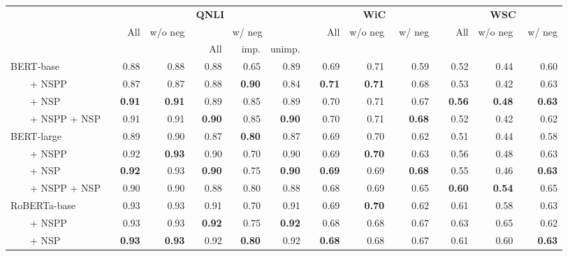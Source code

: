 \newcommand{\sig}{$^{\ast}$}
\setlength{\tabcolsep}{0.04in}
\small
\begin{tabular}{l r@{\hspace{0.15in}} rrrrr r@{\hspace{0.15in}} rrr r@{\hspace{0.15in}} rrr}
\toprule
&& \multicolumn{5}{c}{\textbf{QNLI}} && \multicolumn{3}{c}{\textbf{WiC}} && \multicolumn{3}{c}{\textbf{WSC}} \\ \cmidrule{3-7} \cmidrule{9-11} \cmidrule{13-15}
&& \multirow[c]{2}{*}{All} & \multirow[c]{2}{*}{w/o neg} & \multicolumn{3}{c}{w/ neg} && \multirow[c]{2}{*}{All} & \multirow[c]{2}{*}{w/o neg} & \multirow[c]{2}{*}{\ w/ neg} && \multirow[c]{2}{*}{All} & \multirow[c]{2}{*}{w/o neg} & \multirow[c]{2}{*}{\ w/ neg} \\ 
\cmidrule{5-7}
&& & & \ \ \ All & \ \ imp. & unimp. & & & & & & & \\  \midrule
{BERT-base} && 0.88 & 0.88 & 0.88 & 0.65 & 0.89 && 0.69 & 0.71 & 0.59 && 0.52 & 0.44 & 0.60 \\
~~~~+ NSPP && 0.87 & 0.87 & 0.88 & \textbf{0.90} & 0.84 && \textbf{0.71} & \textbf{0.71} & 0.68 && 0.53 & 0.42 & 0.63 \\
~~~~+ NSP  && \textbf{0.91} & \textbf{0.91} & 0.89 & 0.85 & 0.89 && 0.70 & 0.71 & 0.67 && \textbf{0.56} & \textbf{0.48} & \textbf{0.63} \\
~~~~+ NSPP + NSP && 0.91 & 0.91 & \textbf{0.90} & 0.85 & \textbf{0.90} && 0.70 & 0.71 & \textbf{0.68} && 0.52 & 0.42 & 0.62 \\
\midrule
{BERT-large} && 0.89 & 0.90 & 0.87 & \textbf{0.80} & 0.87 && 0.69 & 0.70 & 0.62 && 0.51 & 0.44 & 0.58 \\
~~~~+ NSPP && 0.92 & \textbf{0.93} & 0.90 & 0.70 & 0.90 && 0.69 & \textbf{0.70} & 0.63 && 0.56 & 0.48 & 0.63 \\
~~~~+ NSP  && \textbf{0.92} & 0.93 & \textbf{0.90} & 0.75 & \textbf{0.90} && \textbf{0.69} & 0.69 & \textbf{0.68} && 0.55 & 0.46 & \textbf{0.63} \\
~~~~+ NSPP + NSP && 0.90 & 0.90 & 0.88 & 0.80 & 0.88 && 0.68 & 0.69 & 0.65 && \textbf{0.60} & \textbf{0.54} & 0.65 \\
\midrule
\midrule
{RoBERTa-base} && 0.93 & 0.93 & 0.91 & 0.70 & 0.91 && 0.69 & \textbf{0.70} & 0.62 && 0.61 & 0.58 & 0.63 \\
~~~~+ NSPP && 0.93 & 0.93 & \textbf{0.92} & 0.75 & \textbf{0.92} && 0.68 & 0.68 & 0.67 && 0.63 & 0.65 & 0.62 \\
~~~~+ NSP  && \textbf{0.93} & \textbf{0.93} & 0.92 & \textbf{0.80} & 0.92 && \textbf{0.68} & 0.68 & 0.67 && 0.61 & 0.60 & \textbf{0.63} \\

\end{tabular}
